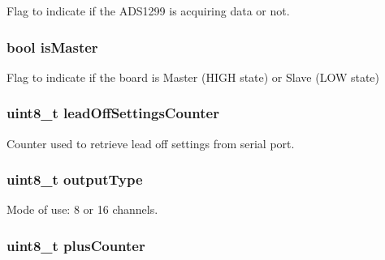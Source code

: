 Flag to indicate if the A\+D\+S1299 is acquiring data or not. 

\hypertarget{group___devices___library_ga6ceb9b5a0a67762763468c0ac71705fe}{}
\subsubsection[{is\+Master}]{\setlength{\rightskip}{0pt plus 5cm}bool is\+Master}\label{group___devices___library_ga6ceb9b5a0a67762763468c0ac71705fe}


Flag to indicate if the board is Master (H\+I\+G\+H state) or Slave (L\+O\+W state) 

\hypertarget{group___devices___library_gacaa36aec7dee3c3535b27afc88dcfc9c}{}
\subsubsection[{lead\+Off\+Settings\+Counter}]{\setlength{\rightskip}{0pt plus 5cm}uint8\+\_\+t lead\+Off\+Settings\+Counter}\label{group___devices___library_gacaa36aec7dee3c3535b27afc88dcfc9c}


Counter used to retrieve lead off settings from serial port. 

\hypertarget{group___devices___library_ga2bc20b2f7f3efa988afcd5c19b3e2edf}{}
\subsubsection[{output\+Type}]{\setlength{\rightskip}{0pt plus 5cm}uint8\+\_\+t output\+Type}\label{group___devices___library_ga2bc20b2f7f3efa988afcd5c19b3e2edf}


Mode of use\+: 8 or 16 channels. 

\hypertarget{group___devices___library_gac011c12f1d5ab04cb87b6edaec1d24ad}{}
\subsubsection[{plus\+Counter}]{\setlength{\rightskip}{0pt plus 5cm}uint8\+\_\+t plus\+Counter}\label{group___devices___library_gac011c12f1d5ab04cb87b6edaec1d24ad}



